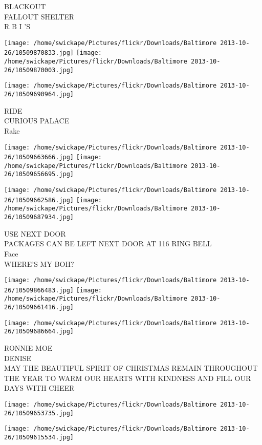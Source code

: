 \documentclass[10pt,letterpaper]{article}
\begin{document}
BLACKOUT\\
FALLOUT SHELTER\\
R B I 'S
\pagebreak

\texttt{[image: /home/swickape/Pictures/flickr/Downloads/Baltimore 2013-10-26/10509870833.jpg]}
\texttt{[image: /home/swickape/Pictures/flickr/Downloads/Baltimore 2013-10-26/10509870003.jpg]}

\vspace{0.25in}
\texttt{[image: /home/swickape/Pictures/flickr/Downloads/Baltimore 2013-10-26/10509690964.jpg]}

RIDE\\
CURIOUS PALACE\\
Rake
\pagebreak

\texttt{[image: /home/swickape/Pictures/flickr/Downloads/Baltimore 2013-10-26/10509663666.jpg]}
\texttt{[image: /home/swickape/Pictures/flickr/Downloads/Baltimore 2013-10-26/10509656695.jpg]}

\texttt{[image: /home/swickape/Pictures/flickr/Downloads/Baltimore 2013-10-26/10509662586.jpg]}
\texttt{[image: /home/swickape/Pictures/flickr/Downloads/Baltimore 2013-10-26/10509687934.jpg]}

USE NEXT DOOR\\
PACKAGES CAN BE LEFT NEXT DOOR AT 116 RING BELL\\
Face\\
WHERE'S MY BOH?
\pagebreak

\texttt{[image: /home/swickape/Pictures/flickr/Downloads/Baltimore 2013-10-26/10509866483.jpg]}
\texttt{[image: /home/swickape/Pictures/flickr/Downloads/Baltimore 2013-10-26/10509661416.jpg]}

\vspace{0.25in}
\texttt{[image: /home/swickape/Pictures/flickr/Downloads/Baltimore 2013-10-26/10509686664.jpg]}

RONNIE MOE\\
DENISE\\
MAY THE BEAUTIFUL SPIRIT OF CHRISTMAS REMAIN THROUGHOUT THE YEAR TO WARM OUR HEARTS WITH KINDNESS AND FILL OUR DAYS WITH CHEER
\pagebreak

\texttt{[image: /home/swickape/Pictures/flickr/Downloads/Baltimore 2013-10-26/10509653735.jpg]}

\vspace{0.25in}
\texttt{[image: /home/swickape/Pictures/flickr/Downloads/Baltimore 2013-10-26/10509615534.jpg]}
\end{document}

